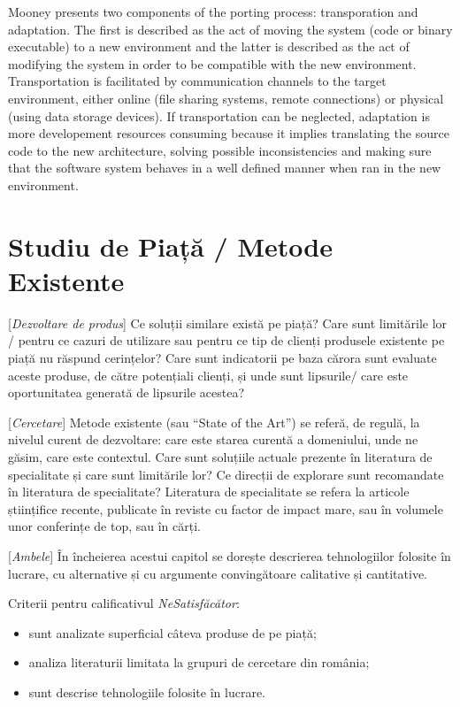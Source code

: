 \documentclass[12pt,a4paper]{report}
\newcommand{\worktype}[1]{[\textit{#1}] }
\newcommand{\dezvoltare}{\worktype{Dezvoltare de produs}}
\newcommand{\cercetare}{\worktype{Cercetare}}
\newcommand{\ambele}{\worktype{Ambele}}
\begin{document}
Mooney \cite{mooney1993issues} presents two components of the porting process: transporation and
adaptation. The first is described as the act of moving the system (code or binary executable) to a
new environment and the latter is described as the act of modifying the system in order to be
compatible with the new environment. Transportation is facilitated by communication channels
to the target environment, either online (file sharing systems, remote connections) or physical
(using data storage devices). If transportation can be neglected, adaptation is more developement
resources consuming because it implies translating the source code to the new architecture, solving
possible inconsistencies and making sure that the software system behaves in a well defined manner
when ran in the new environment.

\chapter{Studiu de Piață / Metode Existente}
\dezvoltare Ce soluții similare există pe piață? Care sunt limitările lor / pentru ce cazuri de utilizare sau pentru ce tip de clienți produsele existente pe piață nu răspund cerințelor? Care sunt indicatorii pe baza cărora sunt evaluate aceste produse, de către potențiali clienți, și unde sunt lipsurile/ care este oportunitatea generată de lipsurile acestea?

\cercetare Metode existente (sau ``State of the Art'') se referă, de regulă, la nivelul curent de dezvoltare: care este starea curentă a domeniului, unde ne găsim, care este contextul. Care sunt soluțiile actuale prezente în literatura de specialitate și care sunt limitările lor? Ce direcții de explorare sunt recomandate în literatura de specialitate? Literatura de specialitate se refera la articole științifice recente, publicate în reviste cu factor de impact mare, sau în volumele unor conferințe de top, sau în cărți.

\ambele În încheierea acestui capitol se dorește descrierea tehnologiilor folosite în lucrare, cu alternative și cu argumente convingătoare calitative și cantitative.

Criterii pentru calificativul \textit{Ne\textit{Satisfăcător}}:
\begin{itemize}
	\item \dezvoltare sunt analizate superficial câteva produse de pe piață;
	\item \cercetare analiza literaturii limitata la grupuri de cercetare din românia;
	\item \ambele sunt descrise tehnologiile folosite în lucrare.
\end{itemize}
\end{document}
